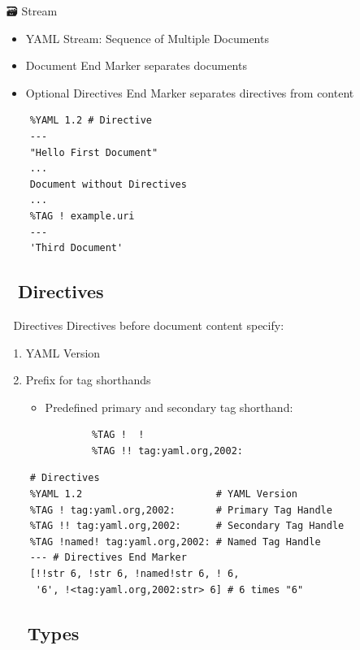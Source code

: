 \documentclass{beamer}
\newcommand{\code}[1]{
  \codebox{\texttt|#1|}
}
\begin{document}
\begin{frame}[fragile]{🗃 Stream}
  \begin{itemize}
    \item YAML Stream: Sequence of Multiple Documents
    \item Document End Marker \code{...} separates documents
    \item Optional Directives End Marker \code{---} separates \alert{directives} from content
  \end{itemize}
  \begin{verbatim}
    %YAML 1.2 # Directive
    ---
    "Hello First Document"
    ...
    Document without Directives
    ...
    %TAG ! example.uri
    ---
    'Third Document'
  \end{verbatim}
\end{frame}

\subsection{📢 Directives}

\begin{frame}[fragile]{📢 Directives}
  Directives before document content specify:
  \begin{enumerate}
    \item YAML Version 
    \item Prefix for tag shorthands 
    \begin{itemize}
      \item Predefined primary and secondary tag shorthand:
      \begin{verbatim}
        %TAG !  !
        %TAG !! tag:yaml.org,2002:
      \end{verbatim}
    \end{itemize}
  \end{enumerate}
  \begin{verbatim}
    # Directives
    %YAML 1.2                       # YAML Version
    %TAG ! tag:yaml.org,2002:       # Primary Tag Handle
    %TAG !! tag:yaml.org,2002:      # Secondary Tag Handle
    %TAG !named! tag:yaml.org,2002: # Named Tag Handle
    --- # Directives End Marker
    [!!str 6, !str 6, !named!str 6, ! 6,
     '6', !<tag:yaml.org,2002:str> 6] # 6 times "6"
  \end{verbatim}
\end{frame}

\subsection{🐠🐙🐶 Types}
\end{document}
